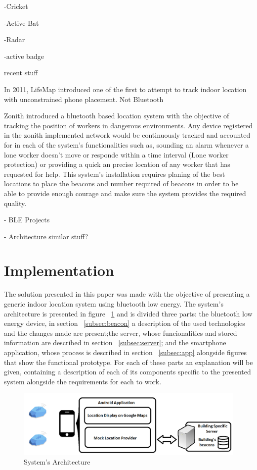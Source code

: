 \documentclass[a4paper]{IEEEtran}
\begin{document}
-Cricket


-Active Bat


-Radar


-active badge


recent stuff


In 2011, LifeMap \cite{lifemap} introduced one of the first to attempt to track indoor location with unconstrained phone placement. Not Bluetooth



Zonith \cite{zonith} introduced a bluetooth based location system with the objective of tracking the position of workers in dangerous environments. Any device registered in the zonith implemented network would be continuously tracked and accounted for in each of the system's functionalities such as, sounding an alarm whenever a lone worker doesn't move or responde within a time interval (Lone worker protection) or providing a quick an precise location of any worker that has requested for help. This system's installation requires planing of the best locations to place the beacons and number required of beacons in order to be able to provide enough courage and make sure the system provides the required quality.


- BLE Projects
	

- Architecture similar stuff?


\section{Implementation}
\label{sec:struture}


The solution presented in this paper was made with the objective of presenting a generic indoor location system using bluetooth low energy. The system's architecture is presented in figure ~\ref{fig:architecture} and is divided three parts: the bluetooth low energy device, in section ~\ref{subsec:beacon} a description of the used technologies and the changes made are present;the server, whose funcionalities and stored information are described in section ~\ref{subsec:server}; and the smartphone application, whose process is described in section ~\ref{subsec:app} alongside figures that show the functional prototype. For each of these parts an explanation will be given, containing a description of each of its components specific to the presented system alongside the requirements for each to work.

\begin{figure}
	\centering
		\includegraphics[width=1\linewidth]{figures/Architecture.png}
	\caption[System's Architecture]{System's Architecture}
	\label{fig:architecture}
\end{figure}
\end{document}
